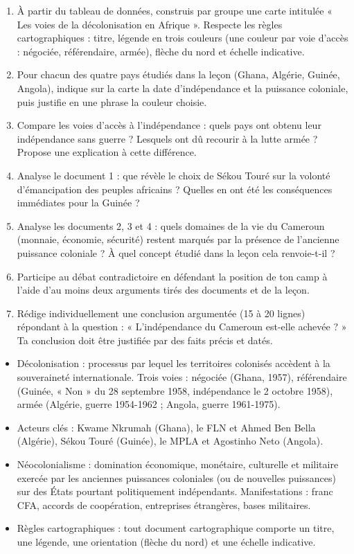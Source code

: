 \documentclass[11pt]{article}
\newcommand{\cle}[1]{{\popxbold\color{popdark}#1}}
\newcounter{popsec}
\newcounter{popsub}
\newcommand{\courssub}[1]{%
  \stepcounter{popsub}%
  \par\vspace{9pt}\noindent{\popxbold\fontsize{11.5}{13}\selectfont\color{popink}{\color{poporange}\thepopsec.\thepopsub}\hspace{6pt}#1}\par\nopagebreak\vspace{4pt}
}
\begin{document}
\begin{enumerate}
\item À partir du tableau de données, construis par groupe une carte intitulée « Les voies de la décolonisation en Afrique ». Respecte les règles cartographiques : titre, légende en trois couleurs (une couleur par voie d'accès : négociée, référendaire, armée), flèche du nord et échelle indicative.
\item Pour chacun des quatre pays étudiés dans la leçon (Ghana, Algérie, Guinée, Angola), indique sur la carte la date d'indépendance et la puissance coloniale, puis justifie en une phrase la couleur choisie.
\item Compare les voies d'accès à l'indépendance : quels pays ont obtenu leur indépendance sans guerre ? Lesquels ont dû recourir à la lutte armée ? Propose une explication à cette différence.
\item Analyse le document 1 : que révèle le choix de Sékou Touré sur la volonté d'émancipation des peuples africains ? Quelles en ont été les conséquences immédiates pour la Guinée ?
\item Analyse les documents 2, 3 et 4 : quels domaines de la vie du Cameroun (monnaie, économie, sécurité) restent marqués par la présence de l'ancienne puissance coloniale ? À quel concept étudié dans la leçon cela renvoie-t-il ?
\item Participe au débat contradictoire en défendant la position de ton camp à l'aide d'au moins deux arguments tirés des documents et de la leçon.
\item Rédige individuellement une conclusion argumentée (15 à 20 lignes) répondant à la question : « L'indépendance du Cameroun est-elle achevée ? » Ta conclusion doit être justifiée par des faits précis et datés.
\end{enumerate}

\courssub{Ressources à mobiliser}

\begin{aretenir}
\begin{itemize}
\item \cle{Décolonisation} : processus par lequel les territoires colonisés accèdent à la souveraineté internationale. Trois voies : \cle{négociée} (Ghana, 1957), \cle{référendaire} (Guinée, « Non » du 28 septembre 1958, indépendance le 2 octobre 1958), \cle{armée} (Algérie, guerre 1954-1962 ; Angola, guerre 1961-1975).
\item Acteurs clés : Kwame \cle{Nkrumah} (Ghana), le \cle{FLN} et Ahmed Ben Bella (Algérie), Sékou \cle{Touré} (Guinée), le \cle{MPLA} et Agostinho Neto (Angola).
\item \cle{Néocolonialisme} : domination économique, monétaire, culturelle et militaire exercée par les anciennes puissances coloniales (ou de nouvelles puissances) sur des États pourtant politiquement indépendants. Manifestations : franc CFA, accords de coopération, entreprises étrangères, bases militaires.
\item Règles cartographiques : tout document cartographique comporte un titre, une légende, une orientation (flèche du nord) et une échelle indicative.
\end{itemize}
\end{aretenir}
\end{document}
